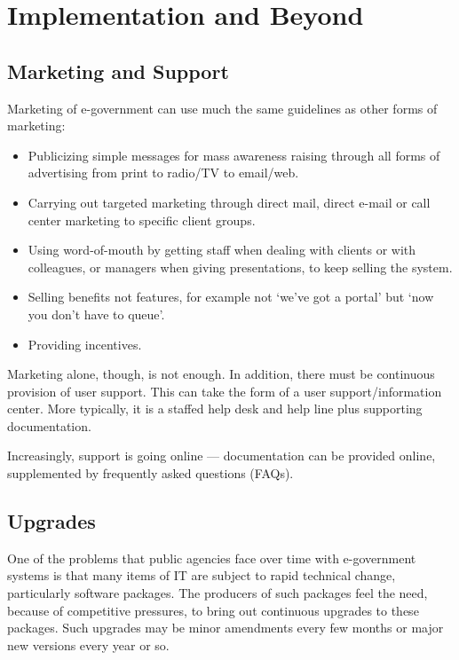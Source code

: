 \section{Implementation and Beyond}

\subsection{Marketing and Support}

Marketing of e-government can use much the
same guidelines as other forms of marketing:

\begin{itemize}
	\item Publicizing simple messages for mass
	awareness raising through all forms of
	advertising from print to radio/TV to
	email/web.
	\item Carrying out targeted marketing through
	direct mail, direct e-mail or call center
	marketing to specific client groups.
	\item  Using word-of-mouth by getting staff when
	dealing with clients or with colleagues,
	or managers when giving presentations,
	to keep selling the system.
	\item Selling benefits not features, for example
	not `we’ve got a portal' but `now you
	don’t have to queue’.
	\item Providing incentives.
\end{itemize}

Marketing alone, though, is not enough. In addition, there must be continuous provision of user support. This can take the form of a user support/information center. More
typically, it is a staffed help desk and help line plus supporting documentation.

Increasingly, support is going online — documentation can be provided online, supplemented by frequently asked questions (FAQs).

\subsection{Upgrades}
One of the problems that public agencies
face over time with e-government systems
is that many items of IT are subject to rapid
technical change, particularly software
packages. The producers of such packages
feel the need, because of competitive pressures, to bring out continuous upgrades to
these packages. Such upgrades may be
minor amendments every few months or
major new versions every year or so.


